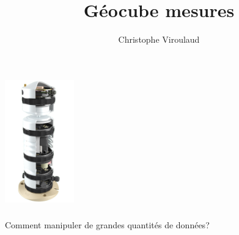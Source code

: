 \documentclass[svgnames,11pt]{beamer}
\author[]{Christophe Viroulaud}
\title{Géocube mesures}
\date{\framebox{\textbf{Donn 02}}}
\institute{Seconde - SNT}
\begin{document}
\begin{frame}
    \titlepage
\end{frame}
\begin{frame}
    \frametitle{}
    \begin{center}
        \includegraphics[width=3cm]{ressources/geocube-interne.png}
    \end{center}

\end{frame}
\begin{frame}
    \frametitle{}

    \begin{framed}\centering
        Comment manipuler de grandes quantités de données?
    \end{framed}

\end{frame}
\end{document}
